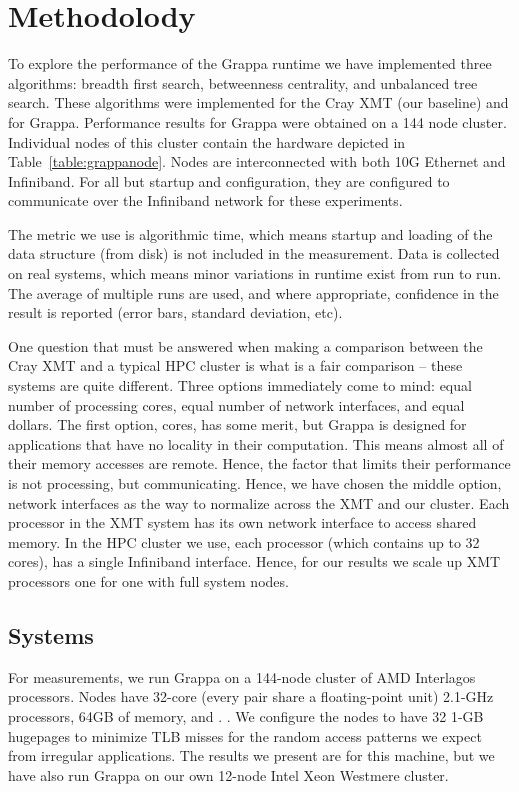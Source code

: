 \section{Methodolody} \label{sec:method}

To explore the performance of the Grappa runtime we have implemented three algorithms: breadth first search, betweenness centrality, and unbalanced tree search.  These algorithms were implemented for the Cray XMT (our baseline) and for Grappa.  Performance results for Grappa were obtained on a 144 node cluster.  Individual nodes of this cluster contain the hardware depicted in Table~\ref{table:grappanode}.  Nodes are interconnected with both 10G Ethernet and Infiniband.  For all but startup and configuration, they are configured to communicate over the Infiniband network for these experiments.

The metric we use is algorithmic time, which means startup and loading of the data structure (from disk) is not included in the measurement.  Data is collected on real systems, which means minor variations in runtime exist from run to run.  The average of multiple runs are used, and where appropriate, confidence in the result is reported (error bars, standard deviation, etc).

One question that must be answered when making a comparison between
the Cray XMT and a typical HPC cluster is what is a fair comparison --
these systems are quite different.  Three options immediately come to
mind: equal number of processing cores, equal number of network
interfaces, and equal dollars.    The first option, cores,
has some merit, but Grappa is designed for applications that have no
locality in their computation.  This means almost all of their memory
accesses are remote.  Hence, the factor that limits their performance
is not processing, but communicating.  Hence, we have chosen the
middle option, network interfaces as the way to normalize across the
XMT and our cluster.  Each processor in the XMT system has its own
network interface to access shared memory.  In the HPC cluster we use,
each processor (which contains up to 32 cores), has a single Infiniband interface.  Hence, for our results we scale up XMT processors one for one with full system nodes.



\subsection{Systems}
For measurements, we run Grappa on a 144-node cluster of AMD
Interlagos processors. Nodes have 32-core (every pair share a floating-point
unit) 2.1-GHz processors, 64GB of memory, and . . We configure the nodes to have 32 1-GB
hugepages to minimize TLB misses for the random access patterns we
expect from irregular applications. The results we present are for
this machine, but we have also run Grappa on our own 12-node Intel
Xeon Westmere cluster.

